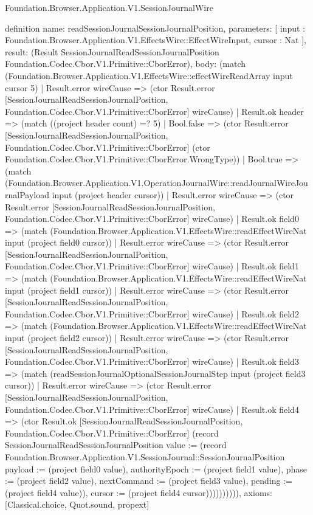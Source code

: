 \begin{lexlean}{Foundation.Browser.Application.V1.SessionJournalWire}
\begin{semanticmodule}
definition{
  name: readSessionJournalSessionJournalPosition,
  parameters: [
    input : Foundation.Browser.Application.V1.EffectsWire::EffectWireInput,
    cursor : Nat
  ],
  result: (Result SessionJournalReadSessionJournalPosition Foundation.Codec.Cbor.V1.Primitive::CborError),
  body: (match (Foundation.Browser.Application.V1.EffectsWire::effectWireReadArray input cursor 5)
    | Result.error wireCause => (ctor Result.error [SessionJournalReadSessionJournalPosition, Foundation.Codec.Cbor.V1.Primitive::CborError] wireCause)
    | Result.ok header => (match ((project header count) =? 5)
      | Bool.false => (ctor Result.error [SessionJournalReadSessionJournalPosition, Foundation.Codec.Cbor.V1.Primitive::CborError] (ctor Foundation.Codec.Cbor.V1.Primitive::CborError.WrongType))
      | Bool.true => (match (Foundation.Browser.Application.V1.OperationJournalWire::readJournalWireJournalPayload input (project header cursor))
        | Result.error wireCause => (ctor Result.error [SessionJournalReadSessionJournalPosition, Foundation.Codec.Cbor.V1.Primitive::CborError] wireCause)
        | Result.ok field0 => (match (Foundation.Browser.Application.V1.EffectsWire::readEffectWireNat input (project field0 cursor))
          | Result.error wireCause => (ctor Result.error [SessionJournalReadSessionJournalPosition, Foundation.Codec.Cbor.V1.Primitive::CborError] wireCause)
          | Result.ok field1 => (match (Foundation.Browser.Application.V1.EffectsWire::readEffectWireNat input (project field1 cursor))
            | Result.error wireCause => (ctor Result.error [SessionJournalReadSessionJournalPosition, Foundation.Codec.Cbor.V1.Primitive::CborError] wireCause)
            | Result.ok field2 => (match (Foundation.Browser.Application.V1.EffectsWire::readEffectWireNat input (project field2 cursor))
              | Result.error wireCause => (ctor Result.error [SessionJournalReadSessionJournalPosition, Foundation.Codec.Cbor.V1.Primitive::CborError] wireCause)
              | Result.ok field3 => (match (readSessionJournalOptionalSessionJournalStep input (project field3 cursor))
                | Result.error wireCause => (ctor Result.error [SessionJournalReadSessionJournalPosition, Foundation.Codec.Cbor.V1.Primitive::CborError] wireCause)
                | Result.ok field4 => (ctor Result.ok [SessionJournalReadSessionJournalPosition, Foundation.Codec.Cbor.V1.Primitive::CborError] (record SessionJournalReadSessionJournalPosition {value := (record Foundation.Browser.Application.V1.SessionJournal::SessionJournalPosition {payload := (project field0 value), authorityEpoch := (project field1 value), phase := (project field2 value), nextCommand := (project field3 value), pending := (project field4 value)}), cursor := (project field4 cursor)}))))))))),
  axioms: [Classical.choice, Quot.sound, propext]
}


\end{semanticmodule}
\end{lexlean}

